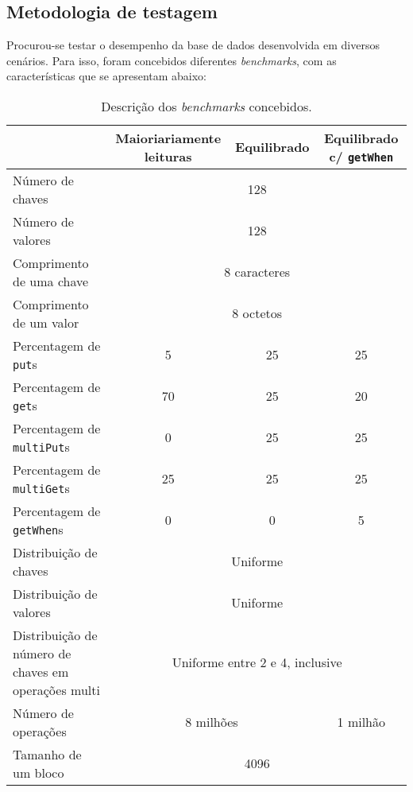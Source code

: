 \documentclass[12pt, a4paper, titlepage]{article}
\begin{document}
\subsection{Metodologia de testagem}

Procurou-se testar o desempenho da base de dados desenvolvida em diversos cenários. Para isso, foram
concebidos diferentes \emph{benchmarks}, com as características que se apresentam abaixo:

\begin{table}[H]
    \begin{center}
        \begin{tabular}{|p{5cm}|c|c|c|}
            \hline & Maioriariamente leituras & Equilibrado & Equilibrado c/ \texttt{getWhen} \\

            \hline Número de chaves         & \multicolumn{3}{c|}{128}          \\
            \hline Número de valores        & \multicolumn{3}{c|}{128}          \\
            \hline Comprimento de uma chave & \multicolumn{3}{c|}{8 caracteres} \\
            \hline Comprimento de um valor  & \multicolumn{3}{c|}{8 octetos}    \\

            \hline Percentagem de \texttt{put}s      & 5  & 25 & 25 \\
            \hline Percentagem de \texttt{get}s      & 70 & 25 & 20 \\
            \hline Percentagem de \texttt{multiPut}s & 0  & 25 & 25 \\
            \hline Percentagem de \texttt{multiGet}s & 25 & 25 & 25 \\
            \hline Percentagem de \texttt{getWhen}s  & 0  & 0  & 5  \\

            \hline Distribuição de chaves  & \multicolumn{3}{c|}{Uniforme} \\
            \hline Distribuição de valores & \multicolumn{3}{c|}{Uniforme} \\
            \hline Distribuição de número de chaves em operações multi &
                \multicolumn{3}{c|}{Uniforme entre 2 e 4, inclusive} \\

            \hline Número de operações & \multicolumn{2}{c|}{8 milhões} & 1 milhão \\
            \hline Tamanho de um bloco & \multicolumn{3}{c|}{4096} \\
            \hline
        \end{tabular}
    \end{center}

    \caption{Descrição dos \emph{benchmarks} concebidos.}
    \label{benckmark-description}
\end{table}
\end{document}

